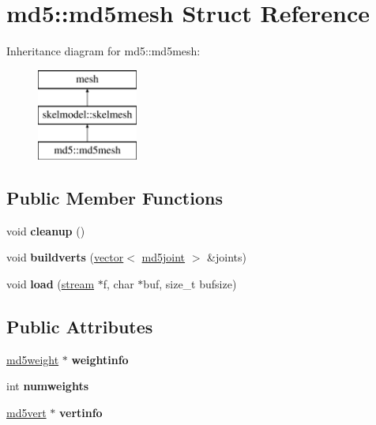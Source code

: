 \hypertarget{structmd5_1_1md5mesh}{}\section{md5\+:\+:md5mesh Struct Reference}
\label{structmd5_1_1md5mesh}
Inheritance diagram for md5\+:\+:md5mesh\+:\begin{figure}[H]
\begin{center}
\leavevmode
\includegraphics[height=3.000000cm]{structmd5_1_1md5mesh}
\end{center}
\end{figure}
\subsection*{Public Member Functions}
\begin{DoxyCompactItemize}
\item 
\mbox{\label{structmd5_1_1md5mesh_a5d2942f26791148f0d608f2c749765e9}} 
void {\bfseries cleanup} ()
\item 
\mbox{\label{structmd5_1_1md5mesh_a47a873b90beb5ef24f99ff7b09e09f77}} 
void {\bfseries buildverts} (\hyperlink{structvector}{vector}$<$ \hyperlink{structmd5joint}{md5joint} $>$ \&joints)
\item 
\mbox{\label{structmd5_1_1md5mesh_ac141ce3236478247e4c0db9d9b68e017}} 
void {\bfseries load} (\hyperlink{structstream}{stream} $\ast$f, char $\ast$buf, size\+\_\+t bufsize)
\end{DoxyCompactItemize}
\subsection*{Public Attributes}
\begin{DoxyCompactItemize}
\item 
\mbox{\label{structmd5_1_1md5mesh_ac790af7e6817f46373b151214f78cc45}} 
\hyperlink{structmd5weight}{md5weight} $\ast$ {\bfseries weightinfo}
\item 
\mbox{\label{structmd5_1_1md5mesh_a58f7623c0f9e7c543b2db4aa147c5eae}} 
int {\bfseries numweights}
\item 
\mbox{\label{structmd5_1_1md5mesh_abda1dbd979ce1e64367368060b22cf4f}} 
\hyperlink{structmd5vert}{md5vert} $\ast$ {\bfseries vertinfo}
\end{DoxyCompactItemize}

